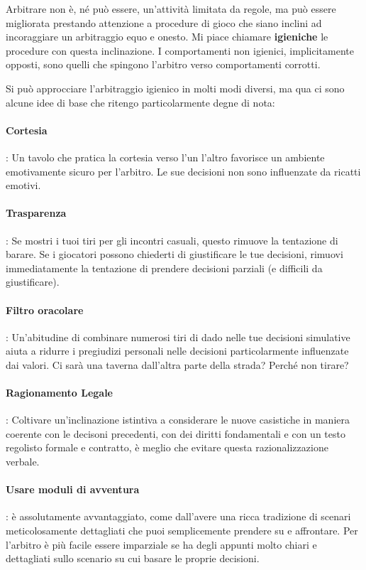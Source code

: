 Arbitrare non è, né può essere, un'attività limitata da regole, ma può essere migliorata prestando attenzione a procedure di gioco che siano inclini ad incoraggiare un arbitraggio equo e onesto. Mi piace chiamare \textbf{igieniche} le procedure con questa inclinazione. I comportamenti non igienici, implicitamente opposti, sono quelli che spingono l'arbitro verso comportamenti corrotti.

Si può approcciare l'arbitraggio igienico in molti modi diversi, ma qua ci sono alcune idee di base che ritengo particolarmente degne di nota:

\paragraph{Cortesia}: Un tavolo che pratica la cortesia verso l'un l'altro favorisce un ambiente emotivamente sicuro per l'arbitro. Le sue decisioni non sono influenzate da ricatti emotivi.

\paragraph{Trasparenza}: Se mostri i tuoi tiri per gli incontri casuali, questo rimuove la tentazione di barare. Se i giocatori possono chiederti di giustificare le tue decisioni, rimuovi immediatamente la tentazione di prendere decisioni parziali (e difficili da giustificare).

\paragraph{Filtro oracolare}: Un'abitudine di combinare numerosi tiri di dado nelle tue decisioni simulative aiuta a ridurre i pregiudizi personali nelle decisioni particolarmente influenzate dai valori. Ci sarà una taverna dall'altra parte della strada? Perché non tirare?

\paragraph{Ragionamento Legale}: Coltivare un'inclinazione istintiva a considerare le nuove casistiche in maniera coerente con le decisoni precedenti, con dei diritti fondamentali e con un testo regolisto formale e contratto, è meglio che evitare questa razionalizzazione verbale.

\paragraph{Usare moduli di avventura}: \dnd{} è assolutamente avvantaggiato, come  dall'avere una ricca tradizione di scenari meticolosamente dettagliati che puoi semplicemente prendere su e affrontare. Per l'arbitro è più facile essere imparziale se ha degli appunti molto chiari e dettagliati sullo scenario su cui basare le proprie decisioni.